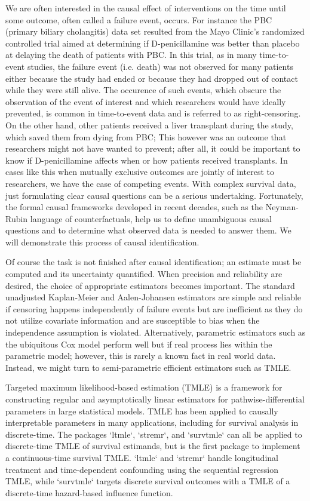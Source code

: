 \documentclass{report}
\newcommand{\1}{\ensuremath{\mathbf{1}}}
\begin{document}
We are often interested in the causal effect of interventions on the time until some outcome, often called a failure event, occurs. For instance the PBC (primary biliary cholangitis) data set resulted from the Mayo Clinic's randomized controlled trial aimed at determining if D-penicillamine was better than placebo at delaying the death of patients with PBC. In this trial, as in many time-to-event studies, the failure event (i.e. death) was not observed for many patients either because the study had ended or because they had dropped out of contact while they were still alive. The occurence of such events, which obscure the observation of the event of interest and which researchers would have ideally prevented, is common in time-to-event data and is referred to as right-censoring. On the other hand, other patients received a liver transplant during the study, which saved them from dying from PBC; This however was an outcome that researchers might not have wanted to prevent; after all, it could be important to know if D-penicillamine affects when or how patients received transplants. In cases like this when mutually exclusive outcomes are jointly of interest to researchers, we have the case of competing events. With complex survival data, just formulating clear causal questions can be a serious undertaking. Fortunately, the formal causal frameworks developed in recent decades, such as the Neyman-Rubin language of counterfactuals, help us to define unambiguous causal questions and to determine what observed data is needed to answer them. We will demonstrate this process of causal identification.

Of course the task is not finished after causal identification; an estimate must be computed and its uncertainty quantified. When precision and reliability are desired, the choice of appropriate estimators becomes important. The standard unadjusted Kaplan-Meier and Aalen-Johansen estimators are simple and reliable if censoring happens independently of failure events but are inefficient as they do not utilize covariate information and are susceptible to bias when the independence assumption is violated. Alternatively, parametric estimators such as the ubiquitous Cox model perform well but if real process lies within the parametric model; however, this is rarely a known fact in real world data. Instead, we might turn to semi-parametric efficient estimators such as TMLE.

Targeted maximum likelihood-based estimation (TMLE) is a framework for constructing regular and asymptotically linear estimators for pathwise-differential parameters in large statistical models. TMLE has been applied to causally interpretable parameters in many applications, including for survival analysis in discrete-time. The packages `ltmle`, `stremr`, and `survtmle` can all be applied to discrete-time TMLE of survival estimands, but  is the first package to implement a continuous-time survival TMLE. `ltmle` and `stremr` handle longitudinal treatment and time-dependent confounding using the sequential regression TMLE, while `survtmle` targets discrete survival outcomes with a TMLE of a discrete-time hazard-based influence function.
\end{document}
